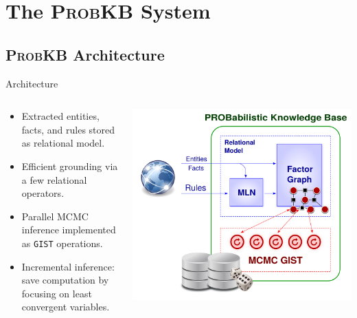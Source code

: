 \documentclass[onlymath,xcolor=pdftex,dvipsnames,table]{beamer}
\newcommand{\probkb}{\textsc{ProbKB}\xspace}
\newcommand{\stt}[1]{\texttt{\small #1}\xspace}
\begin{document}
\section{The \probkb System}
\subsection{\probkb Architecture}
\begin{frame}{Architecture}
\begin{columns}
  \begin{column}{.38\textwidth}
    \footnotesize
    \begin{itemize}
      \item Extracted entities, facts, and rules stored as relational model.
      \item Efficient grounding via a few relational operators.
      \item Parallel MCMC inference implemented as \stt{GIST} operations.
      \item Incremental inference: save computation by focusing on least convergent variables.
    \end{itemize}
  \end{column}

  \begin{column}{.6\textwidth}
    \centering
    \includegraphics[clip,trim=30 0 15 0,width=\columnwidth]{probkbarch.pdf}
  \end{column}
\end{columns}
\end{frame}
\end{document}
